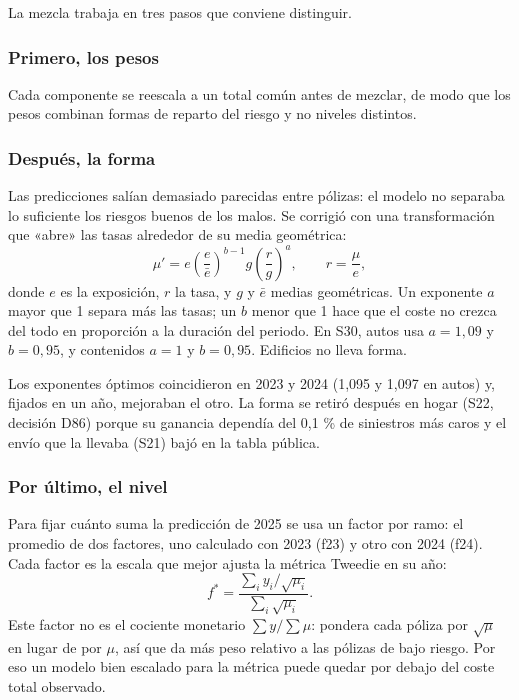 \documentclass[11pt,a4paper]{article}
\newcommand{\fuente}[1]{\par\vspace{-2pt}{\raggedright\sffamily\footnotesize\color{gris}Fuente: #1\par}}
\begin{document}
La mezcla trabaja en tres pasos que conviene distinguir.

\subsubsection{Primero, los pesos}
Cada componente se reescala a un total común antes de mezclar, de modo que los pesos combinan formas de reparto del riesgo y no niveles distintos.

\subsubsection{Después, la forma}
Las predicciones salían demasiado parecidas entre pólizas: el modelo no separaba lo suficiente los riesgos buenos de los malos. Se corrigió con una transformación que «abre» las tasas alrededor de su media geométrica:
\[
\mu' = e\left(\frac{e}{\bar e}\right)^{b-1} g\left(\frac{r}{g}\right)^{a},\qquad r=\frac{\mu}{e},
\]
donde $e$ es la exposición, $r$ la tasa, y $g$ y $\bar e$ medias geométricas. Un exponente $a$ mayor que 1 separa más las tasas; un $b$ menor que 1 hace que el coste no crezca del todo en proporción a la duración del periodo. En S30, autos usa $a=1{,}09$ y $b=0{,}95$, y contenidos $a=1$ y $b=0{,}95$. Edificios no lleva forma.

\begin{porque}
Los exponentes óptimos coincidieron en 2023 y 2024 (1,095 y 1,097 en autos) y, fijados en un año, mejoraban el otro. La forma se retiró después en hogar (S22, decisión D86) porque su ganancia dependía del 0,1 \% de siniestros más caros y el envío que la llevaba (S21) bajó en la tabla pública.
\fuente{decisiones D81 y D86.}
\end{porque}

\subsubsection{Por último, el nivel}
Para fijar cuánto suma la predicción de 2025 se usa un factor por ramo: el promedio de dos factores, uno calculado con 2023 (f23) y otro con 2024 (f24). Cada factor es la escala que mejor ajusta la métrica Tweedie en su año:
\[
f^{*} = \frac{\sum_i y_i/\sqrt{\mu_i}}{\sum_i \sqrt{\mu_i}}.
\]
Este factor no es el cociente monetario $\sum y/\sum\mu$: pondera cada póliza por $\sqrt{\mu}$ en lugar de por $\mu$, así que da más peso relativo a las pólizas de bajo riesgo. Por eso un modelo bien escalado para la métrica puede quedar por debajo del coste total observado.
\end{document}
